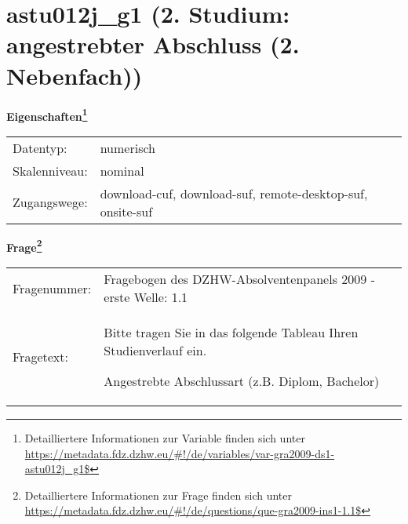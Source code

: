 
    \setcounter{footnote}{0}

    \vspace*{-1.8cm}
	\section{astu012j\_g1 (2. Studium: angestrebter Abschluss (2. Nebenfach))}
	\label{section:astu012j_g1}



    \vspace*{0.5cm}
    \noindent\textbf{Eigenschaften\footnote{Detailliertere Informationen zur Variable finden sich unter
		\url{https://metadata.fdz.dzhw.eu/\#!/de/variables/var-gra2009-ds1-astu012j_g1$}}}\\
	\begin{tabularx}{\hsize}{@{}lX}
	Datentyp: & numerisch \\
	Skalenniveau: & nominal \\
	Zugangswege: &
	  download-cuf, 
	  download-suf, 
	  remote-desktop-suf, 
	  onsite-suf
 \\
    \end{tabularx}



				\vspace*{0.5cm}
                \noindent\textbf{Frage\footnote{Detailliertere Informationen zur Frage finden sich unter
		              \url{https://metadata.fdz.dzhw.eu/\#!/de/questions/que-gra2009-ins1-1.1$}}}\\
				\begin{tabularx}{\hsize}{@{}lX}
					Fragenummer: &
					  Fragebogen des DZHW-Absolventenpanels 2009 - erste Welle:
					  1.1
 \\
					Fragetext: & Bitte tragen Sie in das folgende Tableau Ihren Studienverlauf ein.\par  Angestrebte Abschlussart (z.B. Diplom, Bachelor) \\
				\end{tabularx}





